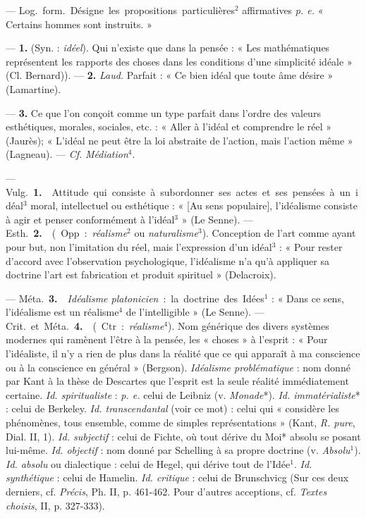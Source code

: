 
	\begin{itemize}[leftmargin=1cm, label=, itemsep=1pt]


 — \si{Log.} \si{form.} Désigne les propositions particulières$^2$
affirmatives {\it p. e.} « Certains hommes sont instruits. »

 — {\bf 1.} (Syn. : {\it idéel}). Qui n'existe que dans la
pensée : « Les mathématiques représentent les rapports des choses dans les
conditions d'une simplicité idéale » (Cl. Bernard)). — {\bf 2.} {\it Laud.}
Parfait : « Ce bien idéal que toute âme désire » (Lamartine).

 — {\bf 3.} Ce que l’on conçoit comme un type parfait dans
l’ordre des valeurs esthétiques, morales, sociales, etc. : « Aller à l'idéal
et comprendre le réel » (Jaurès); « L'idéal ne peut être la loi abstraite
de l’action, mais l’action même » (Lagneau). — {\it Cf.} {\it Médiation}$^4$.

 — \si{Vulg.} {\bf 1.}  Attitude qui consiste à
subordonner ses actes et ses pensées à un idéal$^3$ moral, intellectuel ou
esthétique : « [Au sens populaire], l’idéalisme consiste à agir et penser
conformément à l'idéal$^3$ » (Le Senne). — \si{Esth.} {\bf 2.}
 (Opp. :
{\it réalisme}$^2$ ou {\it naturalisme}$^3$). Conception de l’art comme ayant
pour but, non l’imitation du réel, mais l'expression d’un idéal$^3$ : « Pour
rester d'accord avec l'observation psychologique, l’idéalisme n’a qu’à
appliquer sa doctrine l’art est fabrication et produit
spirituel » (Delacroix).

— \si{Méta.} {\bf 3.}  {\it Idéalisme platonicien} : la
doctrine des Idées$^1$ : « Dans ce sens, l’idéalisme est un réalisme$^4$ de
l’intelligible » (Le Senne). — \si{Crit.} et \si{Méta.} {\bf 4.}  (Ctr. : {\it réalisme}$^4$). Nom générique des divers systèmes
modernes qui ramènent l'être à la pensée, les « choses » à l'esprit : « Pour
l’idéaliste, il n’y a rien de plus dans la
réalité que ce qui apparaît à {\it }ma conscience ou à la conscience en
général » (Bergson). {\it Idéalisme problématique} : nom donné par Kant à la
thèse de Descartes que l'esprit est la seule réalité immédiatement certaine.
{\it Id. spiritualiste} : {\it p. e.} celui de Leibniz (v. {\it Monade}*).
{\it Id. immatérialiste}* : celui de Berkeley. {\it Id. transcendantal}
(voir ce mot) : celui qui « considère les phénomènes, tous ensemble, comme
de simples représentations » (Kant, {\it R. pure}, Dial. II, 1). {\it Id.
subjectif} : celui de Fichte, où tout dérive du Moi* absolu se posant
lui-même. {\it Id. objectif} : nom donné par Schelling à sa propre doctrine
(v. {\it Absolu}$^1$). {\it Id. absolu} ou dialectique : celui de Hegel, qui
dérive tout de l’Idée$^1$. {\it Id. synthétique} : celui de Hamelin.
{\it Id. critique} : celui de Brunschvicg (Sur ces deux derniers, cf.
{\it Précis}, Ph. II, p. 461-462. Pour d’autres acceptions, cf.
{\it Textes choisis}, II, p. 327-333).


\end{itemize}
